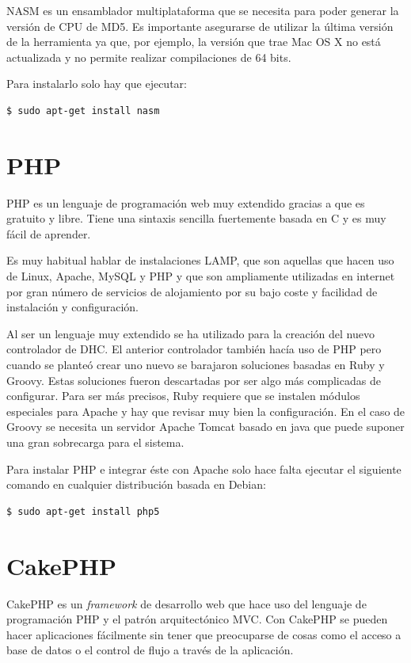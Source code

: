 NASM es un ensamblador multiplataforma que se necesita para poder generar la versión de CPU de MD5. Es importante asegurarse de utilizar la última versión de la herramienta ya que, por ejemplo, la versión que trae Mac OS X no está actualizada y no permite realizar compilaciones de 64 bits.

Para instalarlo solo hay que ejecutar:

\begin{verbatim}
$ sudo apt-get install nasm
\end{verbatim}

\section{PHP}

PHP es un lenguaje de programación web muy extendido gracias a que es gratuito y libre. Tiene una sintaxis sencilla fuertemente basada en C y es muy fácil de aprender.

Es muy habitual hablar de instalaciones LAMP, que son aquellas que hacen uso de Linux, Apache, MySQL y PHP y que son ampliamente utilizadas en internet por gran número de servicios de alojamiento por su bajo coste y facilidad de instalación y configuración.

Al ser un lenguaje muy extendido se ha utilizado para la creación del nuevo controlador de DHC. El anterior controlador también hacía uso de PHP pero cuando se planteó crear uno nuevo se barajaron soluciones basadas en Ruby y Groovy. Estas soluciones fueron descartadas por ser algo más complicadas de configurar. Para ser más precisos, Ruby requiere que se instalen módulos especiales para Apache y hay que revisar muy bien la configuración. En el caso de Groovy se necesita un servidor Apache Tomcat basado en java que puede suponer una gran sobrecarga para el sistema.

Para instalar PHP e integrar éste con Apache solo hace falta ejecutar el siguiente comando en cualquier distribución basada en Debian:

\begin{verbatim}
$ sudo apt-get install php5
\end{verbatim}

\section{CakePHP}

CakePHP es un \emph{framework} de desarrollo web que hace uso del lenguaje de programación PHP y el patrón arquitectónico MVC. Con CakePHP se pueden hacer aplicaciones fácilmente sin tener que preocuparse de cosas como el acceso a base de datos o el control de flujo a través de la aplicación.

